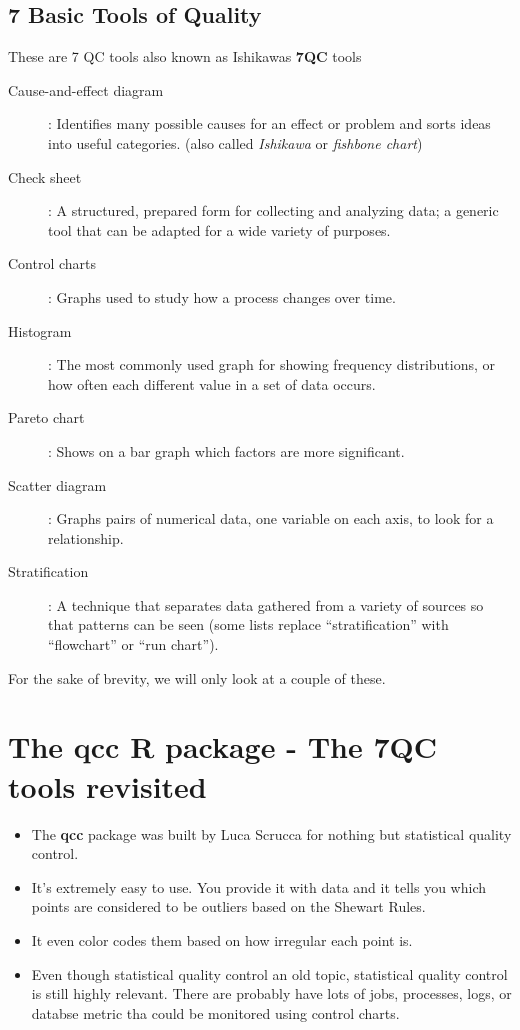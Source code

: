 \documentclass[11pt]{article} %
\begin{document}
\subsection{7 Basic Tools of Quality }
{\large
	These are 7 QC tools also known as Ishikawas \textbf{7QC} tools
	\begin{description}
		\item[Cause-and-effect diagram]: Identifies many possible causes for an effect or problem and sorts ideas into useful categories.
		(also called \textit{Ishikawa} or\textit{ fishbone chart})
		
		\item[Check sheet]: A structured, prepared form for collecting and analyzing data; a generic tool that can be adapted for a wide variety of purposes.
		
		\item[Control charts]: Graphs used to study how a process changes over time.
		
		\item[Histogram]: The most commonly used graph for showing frequency distributions, or how often each different value in a set of data occurs.
		
		\item[Pareto chart]: Shows on a bar graph which factors are more significant.
		
		\item[Scatter diagram]: Graphs pairs of numerical data, one variable on each axis, to look for a relationship.
		
		\item[Stratification]: A technique that separates data gathered from a variety of sources so that patterns can be seen (some lists replace “stratification” with “flowchart” or “run chart”).
	\end{description}
	For the sake of brevity, we will only look at a couple of these.
}


\newpage



\section{The \textbf{qcc} R package - The 7QC tools revisited}

\begin{itemize}
	\item The \textbf{qcc} package  was built by Luca Scrucca for nothing but statistical quality control. 
	\item It's extremely easy to use. You provide it with data and it tells you which points are considered to be outliers based on the Shewart Rules. 
	\item It even color codes them based on how irregular each point is. 
	\item 
	Even though statistical quality control an old topic, statistical quality control is still highly relevant. There are probably have lots of jobs, processes, logs, or databse metric tha could be monitored using control charts.
\end{itemize}
\end{document}
